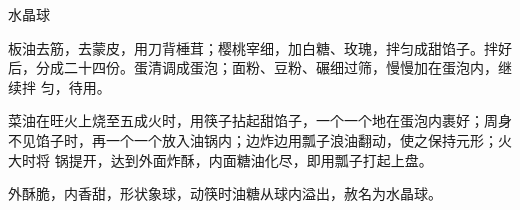 \begin{recipe}{水晶球}

\ingredients


\preparation

\step 板油去筋，去蒙皮，用刀背棰茸；樱桃宰细，加白糖、玫瑰，拌匀成甜馅子。拌好
后，分成二十四份。蛋清调成蛋泡；面粉、豆粉、碾细过筛，慢慢加在蛋泡内，继续拌
匀，待用。

\step 菜油在旺火上烧至五成火时，用筷子拈起甜馅子，一个一个地在蛋泡内裹好；周身
不见馅子时，再一个一个放入油锅内；边炸边用瓢子浪油翻动，使之保持元形；火大时将
锅提开，达到外面炸酥，内面糖油化尽，即用瓢子打起上盘。

\features

外酥脆，内香甜，形状象球，动筷时油糖从球内溢出，赦名为水晶球。

\end{recipe}

